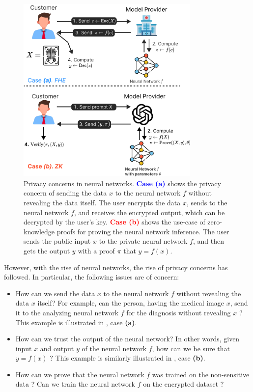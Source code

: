 \documentclass{iacrtrans}
\begin{document}
\begin{figure}
    \centering
    \includegraphics[width=0.8\textwidth]{figures/use-cases.pdf}
    \caption{Privacy concerns in neural networks. \textcolor{blue}{\textbf{Case (a)}} shows 
    the privacy concern of sending the data $x$ to the neural network $f$ without
    revealing the data itself. The user encrypts the data $x$, sends to the 
    neural network $f$, and receives the encrypted output, which can be 
    decrypted by the user's key. \textcolor{red}{\textbf{Case (b)}} shows the use-case 
    of zero-knowledge proofs for proving the neural network inference. The user
    sends the public input $x$ to the private neural network $f$, and then
    gets the output $y$ with a proof $\pi$ that $y = f(x)$.}
    \label{fig:nn-privacy}
\end{figure}

However, with the rise of neural networks, the rise of privacy concerns has
followed. In particular, the following issues are of concern:
\begin{itemize}
    \item How can we send the data $x$ to the neural network $f$ without
    revealing the data $x$ itself? For example, can the person, having the
    medical image $x$, send it to the analyzing neural network $f$ for the
    diagnosis without revealing $x$ \cite{cryptonets}? This example is illustrated 
    in , case \textbf{(a)}.
    \item How can we trust the output of the neural network? In other words,
    given input $x$ and output $y$ of the neural network $f$, how can we be sure
    that $y = f(x)$ \cite{nn-ezkl}? This example is similarly illustrated in
    , case \textbf{(b)}.
    \item How can we prove that the neural network $f$ was trained on the 
    non-sensitive data \cite{zk-training}? Can we train the neural network $f$ on the encrypted
    dataset \cite{fhe-training}?
\end{itemize}
\end{document}
